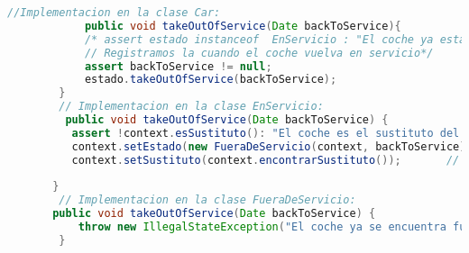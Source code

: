 \begin{lstlisting}[style = javaNormal, language=Java] 
        //Implementacion en la clase Car:
            public void takeOutOfService(Date backToService){
            /* assert estado instanceof  EnServicio : "El coche ya esta fuera de servicio";
            // Registramos la cuando el coche vuelva en servicio*/
            assert backToService != null;
            estado.takeOutOfService(backToService);
        }
        // Implementacion en la clase EnServicio:
         public void takeOutOfService(Date backToService) {
          assert !context.esSustituto(): "El coche es el sustituto del otro";                          // "El coche es sustituto del otro coche";
          context.setEstado(new FueraDeServicio(context, backToService));       // Ponemos un coche fuera de servicio
          context.setSustituto(context.encontrarSustituto());       // Buscamos un coche sustituto
    
       }
        // Implementacion en la clase FueraDeServicio:
       public void takeOutOfService(Date backToService) {
           throw new IllegalStateException("El coche ya se encuentra fuera de Servicio");
        }
    
\end{lstlisting}


